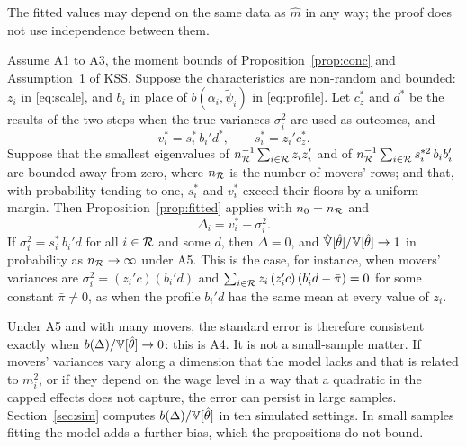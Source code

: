 The fitted values may depend on the same data as $\hat m$ in any way; the proof does not use independence
between them.

\begin{corollary}\label{cor:transfer}
Assume A1 to A3, the moment bounds of Proposition~\ref{prop:conc} and Assumption~1 of KSS. Suppose the
characteristics are non-random and bounded: $z_i$ in \eqref{eq:scale}, and $b_i$ in place of
$b(\tilde\alpha_i,\tilde\psi_i)$ in \eqref{eq:profile}. Let $c_z^*$ and $d^*$ be the results of the two steps when
the true variances $\sigma_i^2$ are used as outcomes, and
\[
v_i^*=s_i^*\,b_i'd^*,\qquad s_i^*=z_i'c_z^* .
\]
Suppose that the smallest eigenvalues of $n_{\mathcal{R}}^{-1}\sum_{i\in\mathcal{R}}z_iz_i'$ and of
$n_{\mathcal{R}}^{-1}\sum_{i\in\mathcal{R}}s_i^{*2}\,b_ib_i'$ are bounded away from zero, where $n_{\mathcal{R}}$ is the number of movers'
rows; and that, with probability tending to one, $s_i^*$ and $v_i^*$ exceed their floors by a uniform margin.
Then Proposition~\ref{prop:fitted} applies with $n_0=n_{\mathcal{R}}$ and
\[
\Delta_i=v_i^*-\sigma_i^2 .
\]
If $\sigma_i^2=s_i^*\,b_i'd$ for all $i\in\mathcal{R}$ and some $d$, then $\Delta=0$, and
$\hat{\mathbb{V}}[\hat\theta]/\mathbb{V}[\hat\theta]\to1$ in probability as $n_{\mathcal{R}}\to\infty$ under A5. This is the case, for
instance, when movers' variances are $\sigma_i^2=(z_i'c)(b_i'd)$ and
$\sum_{i\in\mathcal{R}}z_i\,(z_i'c)\,(b_i'd-\bar\pi)=0$ for some constant $\bar\pi\neq0$, as when the profile $b_i'd$ has
the same mean at every value of $z_i$.
\end{corollary}

Under A5 and with many movers, the standard error is therefore consistent exactly when
$b(\Delta)/\mathbb{V}[\hat\theta]\to0$: this is A4. It is not a small-sample matter. If movers' variances vary along a
dimension that the model lacks and that is related to $m_i^2$, or if they depend on the wage level in a way
that a quadratic in the capped effects does not capture, the error can persist in large samples.
Section~\ref{sec:sim} computes $b(\Delta)/\mathbb{V}[\hat\theta]$ in ten simulated settings. In small samples fitting
the model adds a further bias, which the propositions do not bound.

